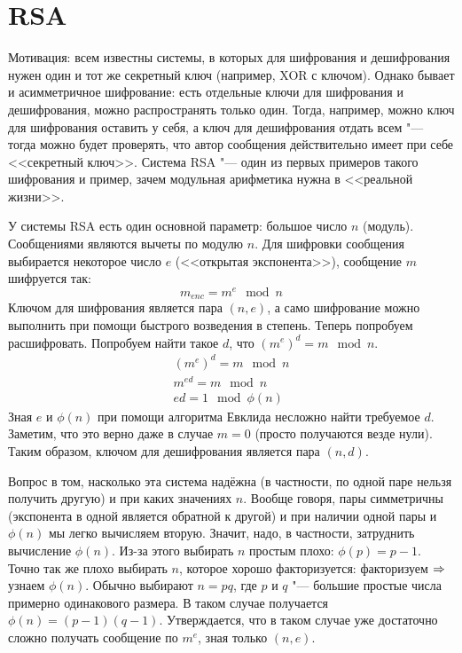 \section{RSA}
Мотивация: всем известны системы, в которых для шифрования и дешифрования нужен один и тот же секретный ключ (например, XOR с ключом).
Однако бывает и асимметричное шифрование: есть отдельные ключи для шифрования и дешифрования, можно распространять только один.
Тогда, например, можно ключ для шифрования оставить у себя, а ключ для дешифрования отдать всем "--- тогда можно будет проверять, что автор сообщения действительно имеет при себе <<секретный ключ>>.
Система RSA "--- один из первых примеров такого шифрования и пример, зачем модульная арифметика нужна в <<реальной жизни>>.

У системы RSA есть один основной параметр: большое число $n$ (модуль).
Сообщениями являются вычеты по модулю $n$.
Для шифровки сообщения выбирается некоторое число $e$ (<<открытая экспонента>>), сообщение $m$ шифруется так:
\[ m_{enc} = m^e \mod n \]
Ключом для шифрования является пара $(n, e)$, а само шифрование можно выполнить при помощи быстрого возведения в степень.
Теперь попробуем расшифровать.
Попробуем найти такое $d$, что $(m^e)^d = m \mod n$.
\begin{gather*}
(m^e)^d = m \mod n\\
m^{ed} = m \mod n\\
ed = 1 \mod \phi(n)
\end{gather*}
Зная $e$ и $\phi(n)$ при помощи алгоритма Евклида несложно найти требуемое $d$.
Заметим, что это верно даже в случае $m=0$ (просто получаются везде нули).
Таким образом, ключом для дешифрования является пара $(n, d)$.

Вопрос в том, насколько эта система надёжна (в частности, по одной паре нельзя получить другую) и при каких значениях $n$.
Вообще говоря, пары симметричны (экспонента в одной является обратной к другой) и при наличии одной пары и $\phi(n)$ мы легко вычисляем вторую.
Значит, надо, в частности, затруднить вычисление $\phi(n)$.
Из-за этого выбирать $n$ простым плохо: $\phi(p)=p-1$.
Точно так же плохо выбирать $n$, которое хорошо факторизуется: факторизуем $\Rightarrow$ узнаем $\phi(n)$.
Обычно выбирают $n=pq$, где $p$ и $q$ "--- большие простые числа примерно одинакового размера.
В таком случае получается $\phi(n) = (p-1)(q-1)$.
Утверждается, что в таком случае уже достаточно сложно получать сообщение по $m^e$, зная только $(n, e)$.

